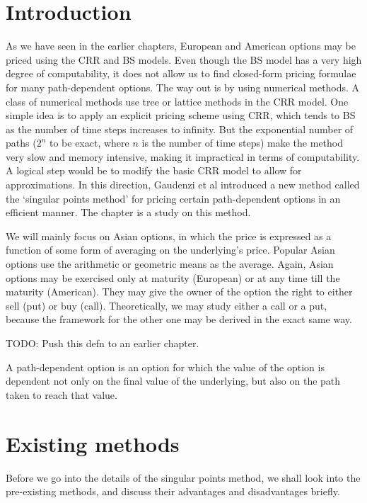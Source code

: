 
\section{Introduction}
\label{sec:sp-intro}
As we have seen in the earlier chapters, European and American options may be priced using the CRR and BS models. Even though the BS model has a very high degree of computability, it does not allow us to find closed-form pricing formulae for many path-dependent options. The way out is by using numerical methods. A class of numerical methods use tree or lattice methods in the CRR model. One simple idea is to apply an explicit pricing scheme using CRR, which tends to BS as the number of time steps increases to infinity. But the exponential number of paths ($2^n$ to be exact, where $n$ is the number of time steps) make the method very slow and memory intensive, making it impractical in terms of computability. A logical step would be to modify the basic CRR model to allow for approximations. In this direction, Gaudenzi et al\cite{Gaudenzi2010} introduced a new method called the `singular points method' for pricing certain path-dependent options in an efficient manner. The chapter is a study on this method.

We will mainly focus on Asian options, in which the price is expressed as a function of some form of averaging on the underlying's price. Popular Asian options use the arithmetic or geometric means as the average. Again, Asian options may be exercised only at maturity (European) or at any time till the maturity (American). They may give the owner of the option the right to either sell (put) or buy (call). Theoretically, we may study either a call or a put, because the framework for the other one may be derived in the exact same way.

TODO: Push this defn to an earlier chapter.
\begin{dfn}
	A path-dependent option is an option for which the value of the option is dependent not only on the final value of the underlying, but also on the path taken to reach that value.
\end{dfn}



\section{Existing methods}
\label{sec:existing-methods}
Before we go into the details of the singular points method, we shall look into the pre-existing methods, and discuss their advantages and disadvantages briefly.

